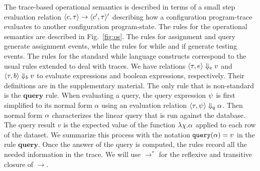 The trace-based operational semantics is described in terms of a small step evaluation relation
$\langle c, \mathtt{\tau} \rangle \to \langle c', \mathtt{\tau} \rangle'$  describing how a configuration program-trace evaluates to another
configuration program-state. The rules for the operational semantics are described in Fig.~\ref{fig:os}.
The rules for assignment and query generate assignment events, while the rules for while and if generate testing events. 
The rules for the standard while language constructs correspond to the usual rules extended to deal with traces. 
We have relations $\langle \mathtt{\tau}, e \rangle \Downarrow_e v $  and $\langle \mathtt{\tau}, b \rangle \Downarrow_b v $  to evaluate expressions and boolean expressions, respectively. Their definitions are in the supplementary material.
The only rule that is non-standard is the $\textbf{query}$ rule. When evaluating a query, the query expression $\psi$ is first simplified to its normal form $\alpha$ using an evaluation relation $\langle \mathtt{\tau}, \psi \rangle \Downarrow_q \alpha$. 
Then normal form $\alpha$ characterizes the linear query that is run against the database. The query result $v$ is the expected value of the function $\lambda \chi.\alpha$ applied to each row of the dataset. We summarize this process with the notation ${\tt query}(\alpha) = v$ in the rule $\textbf{query}$. 
Once the answer of the query is computed, the rules record all the needed information in the trace.  We will use $\to^*$ for the reflexive and transitive closure of $\to$. 
